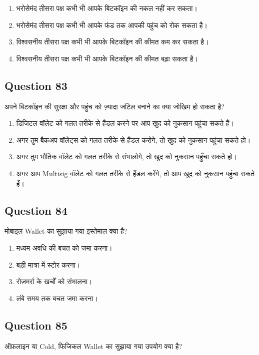 \documentclass[12pt,a4paper]{article}
\begin{document}
\begin{enumerate}[label=\Alph*., leftmargin=*]
\item भरोसेमंद तीसरा पक्ष कभी भी आपके बिटकॉइन की नकल नहीं कर सकता।
\item भरोसेमंद तीसरा पक्ष कभी भी आपके फंड तक आपकी पहुंच को रोक सकता है।
\item विश्वसनीय तीसरा पक्ष कभी भी आपके बिटकॉइन की कीमत कम कर सकता है।
\item विश्वसनीय तीसरा पक्ष कभी भी आपके बिटकॉइन की कीमत बढ़ा सकता है।
\end{enumerate}

\bigskip


\subsection*{Question 83}
अपने बिटकॉइन की सुरक्षा और पहुंच को ज़्यादा जटिल बनाने का क्या जोखिम हो सकता है?

\begin{enumerate}[label=\Alph*., leftmargin=*]
\item डिजिटल वॉलेट को गलत तरीके से हैंडल करने पर आप खुद को नुकसान पहुंचा सकते हैं।
\item अगर तुम बैकअप वॉलेट्स को गलत तरीके से हैंडल करोगे, तो खुद को नुकसान पहुंचा सकते हो।
\item अगर तुम भौतिक वॉलेट को गलत तरीके से संभालोगे, तो खुद को नुकसान पहुँचा सकते हो।
\item अगर आप Multisig वॉलेट को गलत तरीके से हैंडल करेंगे, तो आप खुद को नुकसान पहुंचा सकते हैं।
\end{enumerate}

\bigskip


\subsection*{Question 84}
मोबाइल Wallet का सुझाया गया इस्तेमाल क्या है?

\begin{enumerate}[label=\Alph*., leftmargin=*]
\item मध्यम अवधि की बचत को जमा करना।
\item बड़ी मात्रा में स्टोर करना।
\item रोज़मर्रा के खर्चों को संभालना।
\item लंबे समय तक बचत जमा करना।
\end{enumerate}

\bigskip


\subsection*{Question 85}
ऑफ़लाइन या Cold, फिजिकल Wallet का सुझाया गया उपयोग क्या है?
\end{document}
